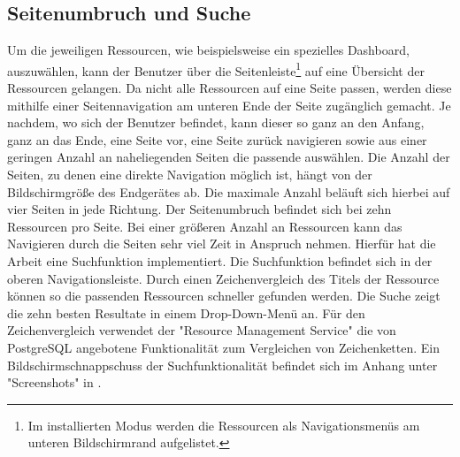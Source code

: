 \subsection{Seitenumbruch und Suche}
\label{subsec:seitenumbruchundsuche}
Um die jeweiligen Ressourcen, wie beispielsweise ein spezielles Dashboard, auszuwählen, kann der Benutzer über
die Seitenleiste\footnote{Im installierten Modus werden die Ressourcen als Navigationsmenüs am unteren Bildschirmrand aufgelistet.}
auf eine Übersicht der Ressourcen gelangen. Da nicht alle Ressourcen auf eine Seite passen, werden diese mithilfe
einer Seitennavigation am unteren Ende der Seite zugänglich gemacht. Je nachdem, wo sich der Benutzer befindet,
kann dieser so ganz an den Anfang, ganz an das Ende, eine Seite vor, eine Seite zurück navigieren sowie aus einer geringen Anzahl
an naheliegenden Seiten die passende auswählen. Die Anzahl der Seiten, zu denen eine direkte Navigation möglich ist, hängt von
der Bildschirmgröße des Endgerätes ab. Die maximale Anzahl beläuft sich hierbei auf vier Seiten in jede Richtung. Der Seitenumbruch befindet sich
bei zehn Ressourcen pro Seite. Bei einer größeren Anzahl an Ressourcen kann das Navigieren durch
die Seiten sehr viel Zeit in Anspruch nehmen. Hierfür hat die Arbeit eine Suchfunktion implementiert. Die Suchfunktion befindet sich
in der oberen Navigationsleiste. Durch einen Zeichenvergleich des Titels der Ressource können so die passenden Ressourcen schneller gefunden
werden. Die Suche zeigt die zehn besten Resultate in einem Drop-Down-Menü an. Für den Zeichenvergleich verwendet der "Resource Management Service"
die von PostgreSQL angebotene Funktionalität zum Vergleichen von Zeichenketten. Ein Bildschirmschnappschuss der Suchfunktionalität befindet sich
im Anhang unter "Screenshots" in .

